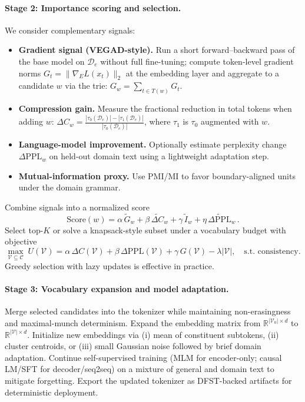 \paragraph{Stage 2: Importance scoring and selection.} We consider complementary signals:
\begin{itemize}
  \item \textbf{Gradient signal (VEGAD-style).} Run a short forward–backward pass of the base model on $\mathcal{D}_e$ without full fine-tuning; compute token-level gradient norms $G_t=\|\nabla_E L(x_t)\|_2$ at the embedding layer and aggregate to a candidate $w$ via the trie: $G_w=\sum_{t\in T(w)}G_t$.
  \item \textbf{Compression gain.} Measure the fractional reduction in total tokens when adding $w$: $\Delta C_w=\frac{|\tau_0(\mathcal{D}_e)|-|\tau_1(\mathcal{D}_e)|}{|\tau_0(\mathcal{D}_e)|}$, where $\tau_1$ is $\tau_0$ augmented with $w$.
  \item \textbf{Language-model improvement.} Optionally estimate perplexity change $\Delta\mathrm{PPL}_w$ on held-out domain text using a lightweight adaptation step.
  \item \textbf{Mutual-information proxy.} Use PMI/MI to favor boundary-aligned units under the domain grammar.
\end{itemize}
Combine signals into a normalized score
\[
\mathrm{Score}(w)=\alpha\,\widetilde{G}_w+\beta\,\widetilde{\Delta C}_w+\gamma\,\widetilde{I}_w+\eta\,\widetilde{\Delta\mathrm{PPL}}_w\,.
\]
Select top-$K$ or solve a knapsack-style subset under a vocabulary budget with objective
\[
\max_{\mathcal{V}\subseteq\mathcal{C}}\; U(\mathcal{V})=\alpha\,\Delta C(\mathcal{V})+\beta\,\Delta\mathrm{PPL}(\mathcal{V})+\gamma\,G(\mathcal{V})-\lambda|\mathcal{V}|,\quad \text{s.t. consistency.}
\]
Greedy selection with lazy updates is effective in practice.

\paragraph{Stage 3: Vocabulary expansion and model adaptation.} Merge selected candidates into the tokenizer while maintaining non-erasingness and maximal-munch determinism. Expand the embedding matrix from $\mathbb{R}^{|\mathcal{V}_0|\times d}$ to $\mathbb{R}^{|\mathcal{V}|\times d}$. Initialize new embeddings via (i) mean of constituent subtokens, (ii) cluster centroids, or (iii) small Gaussian noise followed by brief domain adaptation. Continue self-supervised training (MLM for encoder-only; causal LM/SFT for decoder/seq2seq) on a mixture of general and domain text to mitigate forgetting. Export the updated tokenizer as DFST-backed artifacts for deterministic deployment.

